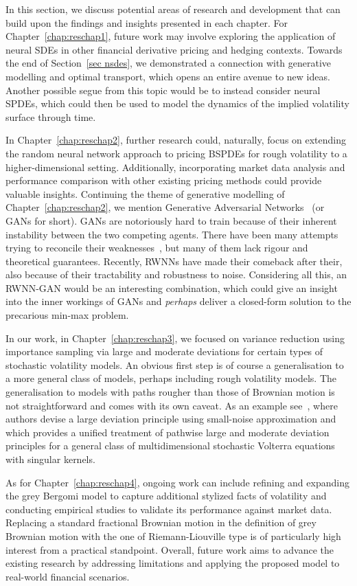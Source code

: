 In this section, we discuss potential areas of research and development that can build upon the findings and insights presented in each chapter. For Chapter~\ref{chap:reschap1}, future work may involve exploring the application of neural SDEs in other financial derivative pricing and hedging contexts. Towards the end of Section~\ref{sec nsdes}, we demonstrated a connection with generative modelling and optimal transport, which opens an entire avenue to new ideas. Another possible segue from this topic would be to instead consider neural SPDEs, which could then be used to model the dynamics of the implied volatility surface through time.


In Chapter~\ref{chap:reschap2}, further research could, naturally, focus on extending the random neural network approach to pricing BSPDEs for rough volatility to a higher-dimensional setting. Additionally, incorporating market data analysis and performance comparison with other existing pricing methods could provide valuable insights. Continuing the theme of generative modelling of Chapter~\ref{chap:reschap2}, we mention Generative
Adversarial Networks~\cite{Goodfellow2020GenerativeNetworks} (or GANs for short). GANs are notoriously hard to train because of their inherent instability between the two competing
agents. There have been many attempts trying to reconcile their weaknesses~\cite{Arjovsky2017WassersteinGAN, Li2017MMDNetwork}, but many of them lack rigour and theoretical guarantees. Recently, RWNNs have made their comeback after their, also because of their tractability and robustness to noise. Considering all this, an RWNN-GAN would be an interesting combination, which could give an insight into the inner workings of GANs and \textit{perhaps} deliver a closed-form solution to the precarious min-max problem.


In our work, in Chapter~\ref{chap:reschap3}, we focused on variance reduction using importance sampling via large and moderate
deviations for certain types of stochastic volatility models. An obvious first step is of course a generalisation to a more general class of models, perhaps including rough volatility models. The generalisation to models with paths rougher than those of Brownian motion is not straightforward and comes with its own caveat. As an example see~\cite{Jacquier2018PathwiseModel, Jacquier2022LargeSystems}, where authors devise a large deviation principle using small-noise approximation and~\cite{Jacquier2022LargeSystems} which provides a unified treatment of pathwise large and moderate deviation principles for a general class of multidimensional stochastic Volterra equations with singular kernels. 


As for Chapter~\ref{chap:reschap4}, ongoing work can include refining and expanding the grey Bergomi model to capture additional stylized facts of volatility and conducting empirical studies to validate its performance against market data. Replacing a standard fractional Brownian motion in the definition of grey Brownian motion with the one of Riemann-Liouville type is of particularly high interest from a practical standpoint. Overall, future work aims to advance the existing research by addressing limitations and applying the proposed model to real-world financial scenarios.
